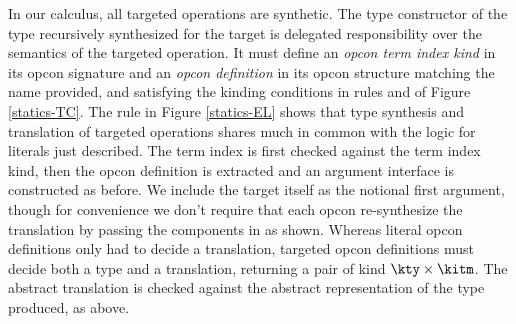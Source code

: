 In our calculus, all targeted operations are synthetic. The type constructor of the type recursively synthesized for the target is delegated responsibility over the semantics of the targeted operation. It must define an \emph{opcon term index kind} in its opcon signature and an \emph{opcon definition} in its opcon structure matching the name provided, and satisfying the kinding conditions in rules  and  of Figure \ref{statics-TC}. The rule  in Figure \ref{statics-EL} shows that type synthesis and translation of targeted operations shares much in common with the logic for literals just described. The term index is first checked against the term index kind, then the opcon definition is extracted and an argument interface is constructed as before. We include the target itself as the notional first argument, though for convenience we don't require that each opcon re-synthesize the translation by passing the components in as shown. 
Whereas literal opcon definitions only had to decide a translation, targeted opcon definitions must decide both a type and a translation, returning a pair of kind $\kty \times \kitm$. The abstract translation is checked against the abstract representation of the type produced, as  above.%

